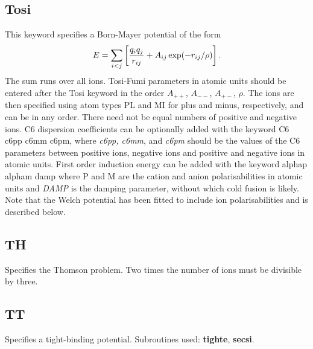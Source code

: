{{{\subsection{Tosi}This keyword specifies a Born-Mayer potential of the form
$$ E = \sum_{i<j}\left[ {q_i q_j\over r_{ij}} + A_{ij}\exp(-r_{ij}/\rho) \right]. $$
The sum runs over all ions. Tosi-Fumi\cite{tosif64} parameters in atomic units should be
entered after the Tosi keyword in the order $A_{++}$, $A_{--}$, $A_{+-}$, $\rho$.
The ions are then specified using atom types PL and MI for plus and minus, respectively,
and can be in any order. There need not be equal numbers of positive and negative ions.
C6 dispersion coefficients can be optionally added with the keyword {C6 c6pp c6mm c6pm\/},
where {\it c6pp, c6mm\/}, and  {\it c6pm\/} should be the values of the C6 parameters between positive ions,
negative ions and positive and negative ions in atomic units. First order induction energy
can be added with the keyword { alphap alpham damp\/} where {P\/} and
{M \/} are the cation and anion polarisabilities in atomic units and {\it DAMP\/}
is the damping parameter, without which cold fusion is likely. Note that the Welch potential
has been fitted to include ion polarisabilities and is described below.


\subsection{TH} Specifies the Thomson problem. Two times the number of ions
must be divisible by three.

\subsection{TT} Specifies a tight-binding potential. 
Subroutines used: {\bf tighte}, {\bf secsi}.

}}}
